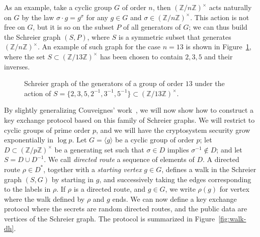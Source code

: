 \documentclass[10pt]{article}
\theoremstyle{plain}
\theoremstyle{definition}
\begin{document}
As an example, take a cyclic group $G$ of order $n$, then $(ℤ/nℤ)^{×}$
acts naturally on $G$ by the law $σ·g=g^σ$ for any $g∈G$ and
$σ∈(ℤ/nℤ)^{×}$. %
This action is not free on $G$, but it is so on the subset $P$ of all
generators of $G$; we can thus build the Schreier graph $(S,P)$, where
$S$ is a symmetric subset that generates $(ℤ/nℤ)^{×}$. %
An example of such graph for the case $n=13$ is shown in
Figure~\ref{fig:schreier}, where the set $S⊂(ℤ/13ℤ)^{×}$ has been
chosen to contain $2,3,5$ and their inverses.

\begin{figure}
  \centering
  \caption{Schreier graph of the generators of a group of order $13$
    under the action of
    $S=\{2,3,5,2^{-1},3^{-1},5^{-1}\}⊂(ℤ/13ℤ)^{×}$.}
  \label{fig:schreier}
\end{figure}

By slightly generalizing Couveignes' work~\cite{Couv}, we will now
show how to construct a key exchange protocol based on this family of
Schreier graphs. %
We will restrict to cyclic groups of prime order $p$, and we will have
the cryptosystem security grow exponentially in $\log p$. %
Let $G=〈g〉$ be a cyclic group of order $p$; let $D⊂(ℤ/pℤ)^{×}$ be a
generating set such that $σ∈D$ implies $σ^{-1}∉D$; and let
$S = D∪D^{-1}$. %
We call \emph{directed route} a sequence of elements of $D$. %
A directed route $ρ∈D^*$, together with a \emph{starting vertex}
$g∈G$, defines a walk in the Schreier graph $(S,G)$ by starting in
$g$, and successively taking the edges corresponding to the labels in
$ρ$. %
If $ρ$ is a directed route, and $g∈G$, we write $ρ(g)$ for vertex
where the walk defined by $ρ$ and $g$ ends. %
We can now define a key exchange protocol where the secrets are random
directed routes, and the public data are vertices of the Schreier
graph. %
The protocol is summarized in Figure~\ref{fig:walk-dh}.
\end{document}
